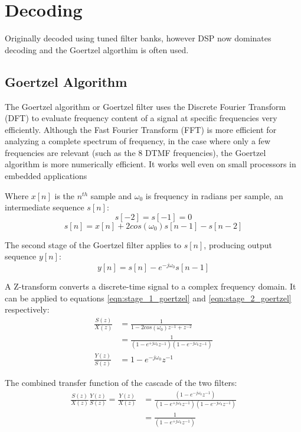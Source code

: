 \documentclass[12pt]{article}
\begin{document}
\section{Decoding}
Originally decoded using tuned filter banks, however DSP now dominates decoding and the Goertzel algorthim is often used\cite{wiki:DTMF}.

\subsection{Goertzel Algorithm}
The Goertzel algorithm or Goertzel filter uses the Discrete Fourier Transform (DFT) to evaluate frequency content of a signal at specific frequencies very efficiently. Although the Fast Fourier Transform (FFT) is more efficient for analyzing a complete spectrum of frequency, in the case where only a few frequencies are relevant (such as the 8 DTMF frequencies), the Goertzel algorithm is more numerically efficient. It works well even on small processors in embedded applications\cite{wiki:Goertzel}

Where $x[n]$ is the $n^{th}$ sample and $\omega _{0}$ is frequency in radians per sample, an intermediate sequence $s[n]$:
$$s[-2]=s[-1]=0$$
\begin{equation} \label{eqn:stage_1_goertzel}
s[n] = x[n] + 2 cos(\omega _{0})s[n-1] - s[n-2]
\end{equation}

The second stage of the Goertzel filter applies to $s[n]$, producing output sequence $y[n]$:
\begin{equation} \label{eqn:stage_2_goertzel}
y[n] = s[n] - e^{-j\omega _{0}}s[n-1]
\end{equation}

A Z-transform converts a discrete-time signal to a complex frequency domain\cite{wiki:Z-transform}. It can be applied to equations \ref{eqn:stage_1_goertzel} and \ref{eqn:stage_2_goertzel} respectively:
\begin{align} \label{eqn:z_goertzel}
\frac{S(z)}{X(z)} &= \frac{1}{1-2cos(\omega _{0})z^{-1} + z^{-2}}\nonumber\\
&= \frac{1}{(1-e^{+j\omega _{0}} z^{-1})(1 - e^{-j\omega _{0}}z^{-1})}\\
\frac{Y(z)}{S(z)} &= 1 - e^{-j\omega _{0}} z^{-1}
\end{align}

The combined transfer function of the cascade of the two filters:
\begin{align} \label{eqn:z_combined_goertzel}
\frac{S(z)}{X(z)}\frac{Y(z)}{S(z)} = \frac{Y(z)}{X(z)} &= \frac{(1-e^{-j\omega _{0}}z^{-1})}{(1-e^{+j\omega _{0}} z^{-1})(1 - e^{-j\omega _{0}}z^{-1})}\nonumber\\
&= \frac{1}{(1-e^{+j\omega _{0}} z^{-1})}
\end{align}

{}

\end{document}
